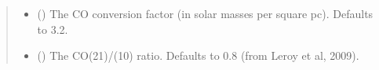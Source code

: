\documentclass[letterpaper,10pt,english]{sphinxmanual}
\begin{document}
\begin{fulllineitems}
\begin{quote}
\begin{description}
\begin{itemize}
\item {} 
\sphinxAtStartPar
{} (\sphinxstyleliteralemphasis{\sphinxupquote{, }}) \textendash{} The CO conversion factor (in solar masses per square pc). Defaults to 3.2.

\item {} 
\sphinxAtStartPar
{} (\sphinxstyleliteralemphasis{\sphinxupquote{, }}) \textendash{} The CO(2\sphinxhyphen{}1)/(1\sphinxhyphen{}0) ratio. Defaults to 0.8 (from Leroy et al, 2009).

\end{itemize}

\end{description}\end{quote}

\end{fulllineitems}


\begin{fulllineitems}
\label{\detokenize{modules:cubespa.utils.RMS}}
\pysigstartsignatures
{}
\pysigstopsignatures
\end{fulllineitems}

\end{document}
